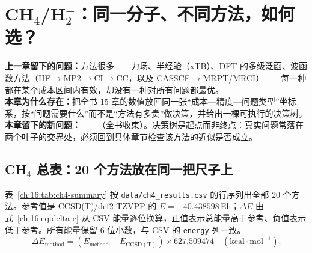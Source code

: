 
\section{CH$_4$/H$_2^-$：同一分子、不同方法，如何选？}
\label{ch:16:sec:title}

\begin{problemchain}
\textbf{上一章留下的问题：}方法很多——力场、半经验（xTB）、DFT 的多级泛函、波函数方法（HF$\to$MP2$\to$CI$\to$CC，以及 CASSCF$\to$MRPT/MRCI）——每一种都在某个成本区间内有效，却没有一种对所有问题都最优。\\
\textbf{本章为什么存在：}把全书 15 章的数值放回同一张“成本—精度—问题类型”坐标系，按“问题需要什么”而不是“方法有多贵”做决策，并给出一棵可执行的决策树。\\
\textbf{本章留下的新问题：}——（全书收束）。决策树是起点而非终点：真实问题常落在两个叶子的交界处，必须回到具体章节检查该方法的近似是否成立。
\end{problemchain}

\subsection{CH$_4$ 总表：20 个方法放在同一把尺子上}
\label{ch:16:sec:ch4-table}

表~\ref{ch:16:tab:ch4-summary} 按 \texttt{data/ch4\_results.csv} 的行序列出全部 20 个方法。参考值是 CCSD(T)/def2-TZVPP 的 $E=-40.438598$\,Eh；$\Delta E$ 由式~\eqref{ch:16:eq:delta-e} 从 CSV 能量逐位换算，正值表示总能量高于参考、负值表示低于参考。所有能量保留 6 位小数，与 CSV 的 \texttt{energy} 列一致。
\begin{equation}
\Delta E_{\mathrm{method}}
= \left(E_{\mathrm{method}}-E_{\mathrm{CCSD(T)}}\right)\times 627.509474
\quad(\mathrm{kcal\cdot mol^{-1}}).
\label{ch:16:eq:delta-e}
\end{equation}

